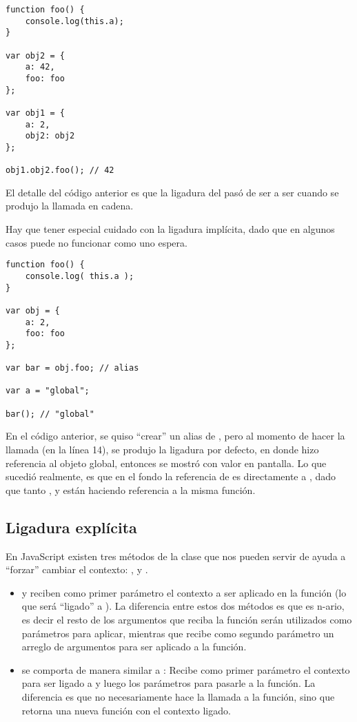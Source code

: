\begin{lstlisting}
function foo() {
	console.log(this.a);
}

var obj2 = {
	a: 42,
	foo: foo
};

var obj1 = {
	a: 2,
	obj2: obj2
};

obj1.obj2.foo(); // 42
\end{lstlisting}

El detalle del código anterior es que la ligadura del  pasó de ser  a ser  cuando se produjo la llamada en cadena.

Hay que tener especial cuidado con la ligadura implícita, dado que en algunos casos puede no funcionar como uno espera.

\begin{lstlisting}
function foo() {
	console.log( this.a );
}

var obj = {
	a: 2,
	foo: foo
};

var bar = obj.foo; // alias

var a = "global";

bar(); // "global"
\end{lstlisting}

En el código anterior, se quiso "`crear"'  un alias de , pero al momento de hacer la llamada (en la línea 14), se produjo la ligadura por defecto, en donde  hizo referencia al objeto global, entonces se mostró  con valor  en pantalla. Lo que sucedió realmente, es que en el fondo la referencia de  es directamente a , dado que tanto ,  y  están haciendo referencia a la misma función.

\subsection{Ligadura explícita}

En JavaScript existen tres métodos de la clase  que nos pueden servir de ayuda a "`forzar"' cambiar el contexto: ,  y .

\begin{itemize}
\item {} y  reciben como primer parámetro el contexto a ser aplicado en la función (lo que será "`ligado"' a ). La diferencia entre estos dos métodos es que  es n-ario, es decir el resto de los argumentos que reciba la función serán utilizados como parámetros para aplicar, mientras que  recibe como segundo parámetro un arreglo de argumentos para ser aplicado a la función.
\item {} se comporta de manera similar a : Recibe como primer parámetro el contexto para ser ligado a  y luego los parámetros para pasarle a la función. La diferencia es que  no necesariamente hace la llamada a la función, sino que retorna una nueva función con el contexto ligado.
\end{itemize}


